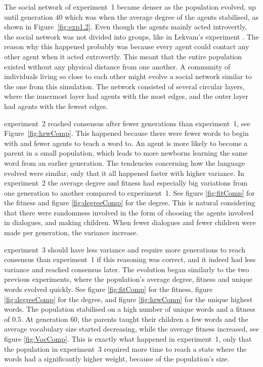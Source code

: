 The social network of experiment~1 became denser as the population evolved, up until generation $40$ which was when the average degree of the agents stabilised, as shown in Figure~\ref{fig:exp1.2}. Even though the agents mainly acted introvertly, the social network was not divided into groups, like in Lekvam’s experiment \citep[Section 5.1]{lekvam2014co}. The reason why this happened probably was because every agent could contact any other agent when it acted extrovertly. This meant that the entire population existed without any physical distance from one another. A community of individuals living so close to each other might evolve a social network similar to the one from this simulation. The network consisted of several circular layers, where the innermost layer had agents with the most edges, and the outer layer had agents with the fewest edges.

experiment~2 reached consensus after fewer generations than experiment~1, see Figure~\ref{fig:hrwComp}. This happened because there were fewer words to begin with and fewer agents to teach a word to. An agent is more likely to become a parent in a small population, which leads to more newborns learning the same word from an earlier generation. The tendencies concerning how the language evolved were similar, only that it all happened faster with higher variance. In experiment~2 the average degree and fitness had especially big variations from one generation to another compared to experiment~1. See figure \ref{fig:fitComp} for the fitness and figure \ref{fig:degreeComp} for the degree. This is natural considering that there were randomness involved in the form of choosing the agents involved in dialogues, and making children. When fewer dialogues and fewer children were made per generation, the variance increase.

experiment~3 should have less variance and require more generations to reach consensus than experiment~1 if this reasoning was correct, and it indeed had less variance and reached consensus later. The evolution began similarly to the two previous experiments, where the population's average degree, fitness and unique words evolved quickly. See figure \ref{fig:fitComp} for the fitness, figure \ref{fig:degreeComp} for the degree, and figure \ref{fig:hrwComp} for the unique highest words. The population stabilised on a high number of unique words and a fitness of $0.5$. At generation $60$, the parents taught their children a few words and the average vocabulary size started decreasing, while the average fitness increased, see figure \ref{fig:VocComp}. This is exactly what happened in experiment~1, only that the population in experiment~3 required more time to reach a state where the words had a significantly higher weight, because of the population’s size. 

